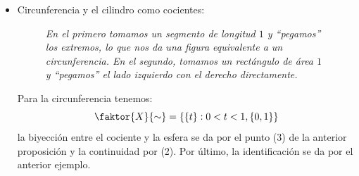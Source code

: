 \begin{ej}[Anteriores]
\begin{itemize}
    \item Circunferencia y el cilindro como cocientes:
    \begin{figure}[H]
        \centering
        \caption{\textit{En el primero tomamos un segmento de longitud $1$ y ``pegamos'' los extremos, lo que nos da una figura equivalente a un circunferencia. En el segundo, tomamos un rectángulo de área $1$ y ``pegamos'' el lado izquierdo con el derecho directamente.}}
    \end{figure}

    Para la circunferencia tenemos:
    \[
        \faktor{X}{\sim} = \left\{ \left\{ t \right\} : 0 < t < 1, \left\{ 0, 1 \right\} \right\}
    \]
    la biyección entre el cociente y la esfera se da por el punto (3) de la anterior proposición y la continuidad por (2). Por último, la identificación se da por el anterior ejemplo.


\end{itemize}
\end{ej}
